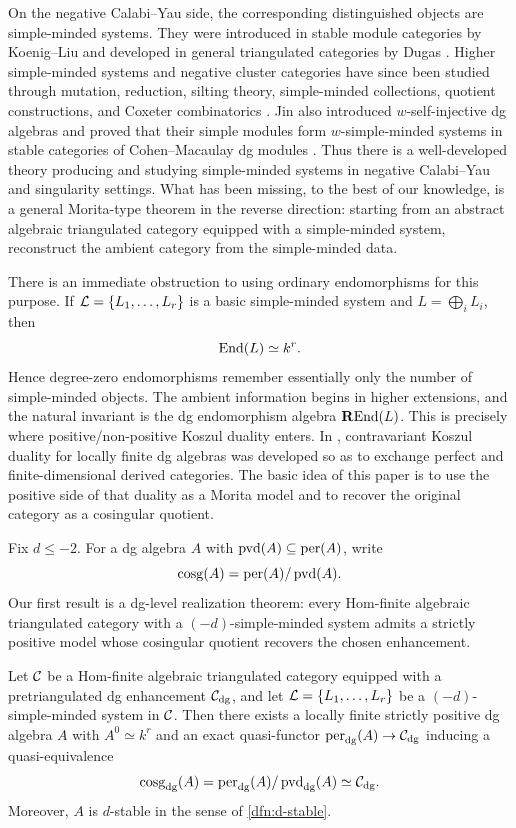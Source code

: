\documentclass[11pt,a4paper,dvipsnames,x11names]{amsart}
\begin{document}
On the negative Calabi--Yau side, the corresponding distinguished objects are simple-minded systems. They were introduced in stable module categories by Koenig--Liu and developed in general triangulated categories by Dugas \cite{KoenigLiu12,Dugas15}. Higher simple-minded systems and negative cluster categories have since been studied through mutation, reduction, silting theory, simple-minded collections, quotient constructions, and Coxeter combinatorics \cite{CoelhoPauksztello20,Jin23Reduction,IyamaJin23,CoelhoPauksztelloPloog22,Fedele22}. Jin also introduced $w$-self-injective dg algebras and proved that their simple modules form $w$-simple-minded systems in stable categories of Cohen--Macaulay dg modules \cite[Theorem~5.6]{Jin20}. Thus there is a well-developed theory producing and studying simple-minded systems in negative Calabi--Yau and singularity settings. What has been missing, to the best of our knowledge, is a general Morita-type theorem in the reverse direction: starting from an abstract algebraic triangulated category equipped with a simple-minded system, reconstruct the ambient category from the simple-minded data.

There is an immediate obstruction to using ordinary endomorphisms for this purpose. If $\mathcal L=\{L_1,\dots,L_r\}$ is a basic simple-minded system and $L=\bigoplus_iL_i$, then
\[
\operatorname{End}(L)\simeq k^r.
\]
Hence degree-zero endomorphisms remember essentially only the number of simple-minded objects. The ambient information begins in higher extensions, and the natural invariant is the dg endomorphism algebra $\operatorname{\mathbf{R}End}(L)$. This is precisely where positive/non-positive Koszul duality enters. In \cite[Theorem~D]{Fus24}, contravariant Koszul duality for locally finite dg algebras was developed so as to exchange perfect and finite-dimensional derived categories. The basic idea of this paper is to use the positive side of that duality as a Morita model and to recover the original category as a cosingular quotient.

Fix $d\leq-2$. For a dg algebra $A$ with $\operatorname{pvd}(A)\subseteq\operatorname{per}(A)$, write
\[
\operatorname{cosg}(A)=\operatorname{per}(A)/\operatorname{pvd}(A).
\]
Our first result is a dg-level realization theorem: every Hom-finite algebraic triangulated category with a $(-d)$-simple-minded system admits a strictly positive model whose cosingular quotient recovers the chosen enhancement.

\begin{mainthm}\label{main:realization}
Let $\mathcal C$ be a Hom-finite algebraic triangulated category equipped with a pretriangulated dg enhancement $\mathcal C_{\mathrm{dg}}$, and let $\mathcal L=\{L_1,\dots,L_r\}$ be a $(-d)$-simple-minded system in $\mathcal C$. Then there exists a locally finite strictly positive dg algebra $A$ with $A^0\simeq k^r$ and an exact quasi-functor $\operatorname{per}_{\mathrm{dg}}(A)\to\mathcal C_{\mathrm{dg}}$ inducing a quasi-equivalence
\[
\operatorname{cosg}_{\mathrm{dg}}(A)=\operatorname{per}_{\mathrm{dg}}(A)/\operatorname{pvd}_{\mathrm{dg}}(A)\simeq\mathcal C_{\mathrm{dg}}.
\]
Moreover, $A$ is $d$-stable in the sense of \cref{dfn:d-stable}.
\end{mainthm}
\end{document}

